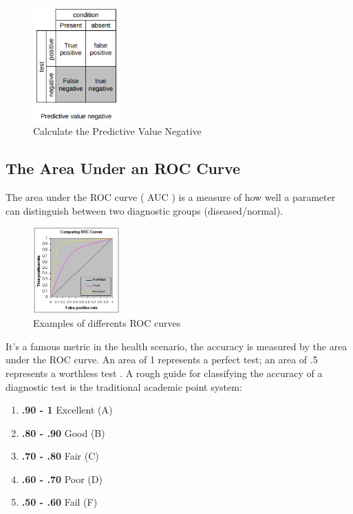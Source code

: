 \begin{figure}[H]
\centering
\includegraphics[width=0.3\textwidth]{./figures/PredictiveValueNegative}
\caption{Calculate the Predictive Value Negative}
\end{figure}

\subsection[The Area Under an ROC Curve]{The Area Under an ROC Curve}

The area under the ROC curve ( AUC ) is a measure of how well a parameter can distinguish between two diagnostic groups (diseased/normal). 

\begin{figure}[H]
\centering
\includegraphics[width=0.3\textwidth]{./figures/ROC}
\caption{Examples of differents ROC curves \cite{area-roc-curve}}
\end{figure}

It's a famous metric in the health scenario, the accuracy is measured by the area under the ROC curve. An area of 1 represents a perfect test; an area of .5 represents a worthless test \cite{area-roc-curve}. A rough guide for classifying the accuracy of a diagnostic test is the traditional academic point system:

\begin{enumerate}
\item \textbf{.90 - 1} Excellent (A)
\item \textbf{.80 - .90} Good (B)
\item \textbf{.70 - .80} Fair (C)
\item \textbf{.60 - .70} Poor (D)
\item \textbf{.50 - .60} Fail (F)
\end{enumerate}


